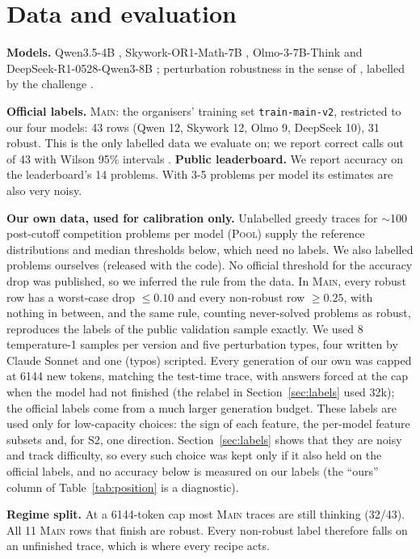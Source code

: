 \documentclass{article}
\newcommand{\stwo}{\textsc{S2}}
\begin{document}
\section{Data and evaluation}
\label{sec:data}
\textbf{Models.} Qwen3.5-4B \citep{qwen35}, Skywork-OR1-Math-7B \citep{he2025skywork}, Olmo-3-7B-Think \citep{olmo3} and DeepSeek-R1-0528-Qwen3-8B \citep{deepseek2025r1,yang2025qwen3}; perturbation robustness in the sense of \citet{mirzadeh2025gsmsymbolic}, labelled by the challenge \citep{stefanik2026aimointerp}.

\textbf{Official labels.} \textsc{Main}: the organisers' training set \texttt{train-main-v2}, restricted to our four models: 43 rows (Qwen 12, Skywork 12, Olmo 9, DeepSeek 10), 31 robust. This is the only labelled data we evaluate on; we report correct calls out of 43 with Wilson 95\% intervals \citep{wilson1927}.
\textbf{Public leaderboard.} We report accuracy on the leaderboard's 14 problems. With 3-5 problems per model its estimates are also very noisy.

\textbf{Our own data, used for calibration only.} Unlabelled greedy traces for $\sim$100 post-cutoff competition problems per model (\textsc{Pool}) supply the reference distributions and median thresholds below, which need no labels. We also labelled problems ourselves (released with the code). No official threshold for the accuracy drop was published, so we inferred the rule from the data. In \textsc{Main}, every robust row has a worst-case drop $\le 0.10$ and every non-robust row $\ge 0.25$, with nothing in between, and the same rule, counting never-solved problems as robust, reproduces the labels of the public validation sample exactly. We used 8 temperature-1 samples per version and five perturbation types, four written by Claude Sonnet and one (typos) scripted. Every generation of our own was capped at 6144 new tokens, matching the test-time trace, with answers forced at the cap when the model had not finished (the relabel in Section~\ref{sec:labels} used 32k); the official labels come from a much larger generation budget. These labels are used only for low-capacity choices: the sign of each feature, the per-model feature subsets and, for \stwo{}, one direction. Section~\ref{sec:labels} shows that they are noisy and track difficulty, so every such choice was kept only if it also held on the official labels, and no accuracy below is measured on our labels (the ``ours'' column of Table~\ref{tab:position} is a diagnostic).

\textbf{Regime split.} At a 6144-token cap most \textsc{Main} traces are still thinking (32/43).
All 11 \textsc{Main} rows that finish are robust. Every non-robust label therefore falls on an unfinished trace, which is where every recipe acts.
\end{document}
